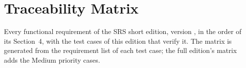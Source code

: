 \section{Traceability Matrix}\label{app:trace}
Every functional requirement of the SRS short edition, version \SRSversion, in the order of its Section~4, with the test cases of this edition that verify it. The matrix is generated from the requirement list of each test case; the full edition's matrix adds the Medium priority cases.


